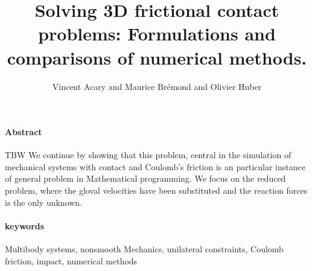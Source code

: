 \documentclass[10pt,a4paper]{article}
\title{Solving 3D frictional contact problems: Formulations and comparisons of numerical methods.}
\author{Vincent Acary and Maurice Br\'emond and Olivier Huber}
\begin{document}
\maketitle
\tableofcontents
\clearpage
{\paragraph{Abstract} TBW
We continue by showing that this problem, central in the simulation of mechanical systems with contact and Coulomb's friction is an particular instance of general problem in Mathematical programming.
We focus on the reduced problem, where the gloval velocities have been substituted and the reaction forces is the only unknown.

}

{\paragraph{keywords} Multibody systems, nonsmooth Mechanics, unilateral constraints, Coulomb friction, impact, numerical methods}




\end{document}
